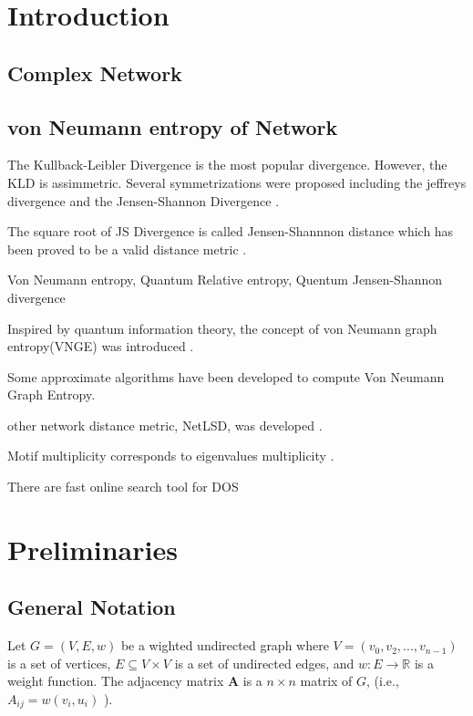 \documentclass[senior,final,11pt]{iscs-thesis}
\begin{document}
\chapter{Introduction}
\section{Complex Network}
\section{von Neumann entropy of Network}

The Kullback-Leibler Divergence \cite{kullback1951information} is the most popular divergence.
However, the KLD is assimmetric.
Several symmetrizations \cite{nielsen2019jensen} were proposed including the jeffreys divergence \cite{jeffreys1946invariant} and the Jensen-Shannon Divergence \cite{lin1991divergence}.

The square root of JS Divergence is called Jensen-Shannnon distance which has been proved to be a valid distance metric \cite{endres2003new}.

Von Neumann entropy,
Quantum Relative entropy,
Quentum Jensen-Shannon divergence \cite{briet2009properties, lamberti2008metric}

Inspired by quantum information theory, the concept of von Neumann graph entropy(VNGE) was introduced \cite{braunstein2006laplacian}.

Some approximate algorithms have been developed to compute Von Neumann Graph Entropy\cite{chen2019fast,tsitsulin2020just}.

other network distance metric, NetLSD, was developed \cite{tsitsulin2018netlsd,tsitsulin2020just}.

Motif multiplicity corresponds to eigenvalues multiplicity \cite{mehatari2015effect,dong2019network}.

There are fast online search tool for DOS\cite{borysov2018online,geilhufe2018towards}

\chapter{Preliminaries}
\section{General Notation}

Let $G=(V,E,w)$ be a wighted undirected graph where $V=(v_0, v_2, ..., v_{n-1})$ is a set of vertices, $E \subseteq V\times V$ is a set of undirected edges, and $w: E \rightarrow \mathbb{R}$ is a weight function. The adjacency matrix ${\mathbf A}$ is a $n \times n$ matrix of $G$, (i.e., $ A_{ij}= w(v_i ,u_i)$ ).
\end{document}
